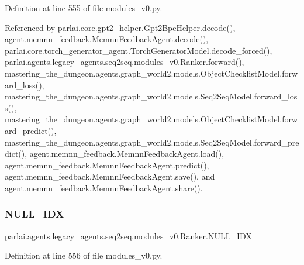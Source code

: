 Definition at line 555 of file modules\+\_\+v0.\+py.



Referenced by parlai.\+core.\+gpt2\+\_\+helper.\+Gpt2\+Bpe\+Helper.\+decode(), agent.\+memnn\+\_\+feedback.\+Memnn\+Feedback\+Agent.\+decode(), parlai.\+core.\+torch\+\_\+generator\+\_\+agent.\+Torch\+Generator\+Model.\+decode\+\_\+forced(), parlai.\+agents.\+legacy\+\_\+agents.\+seq2seq.\+modules\+\_\+v0.\+Ranker.\+forward(), mastering\+\_\+the\+\_\+dungeon.\+agents.\+graph\+\_\+world2.\+models.\+Object\+Checklist\+Model.\+forward\+\_\+loss(), mastering\+\_\+the\+\_\+dungeon.\+agents.\+graph\+\_\+world2.\+models.\+Seq2\+Seq\+Model.\+forward\+\_\+loss(), mastering\+\_\+the\+\_\+dungeon.\+agents.\+graph\+\_\+world2.\+models.\+Object\+Checklist\+Model.\+forward\+\_\+predict(), mastering\+\_\+the\+\_\+dungeon.\+agents.\+graph\+\_\+world2.\+models.\+Seq2\+Seq\+Model.\+forward\+\_\+predict(), agent.\+memnn\+\_\+feedback.\+Memnn\+Feedback\+Agent.\+load(), agent.\+memnn\+\_\+feedback.\+Memnn\+Feedback\+Agent.\+predict(), agent.\+memnn\+\_\+feedback.\+Memnn\+Feedback\+Agent.\+save(), and agent.\+memnn\+\_\+feedback.\+Memnn\+Feedback\+Agent.\+share().

\mbox{\label{classparlai_1_1agents_1_1legacy__agents_1_1seq2seq_1_1modules__v0_1_1Ranker_a17d8139e8d7e9952f0f17e8884710744}} 
\subsubsection{\texorpdfstring{N\+U\+L\+L\+\_\+\+I\+DX}{NULL\_IDX}}
{\footnotesize\ttfamily parlai.\+agents.\+legacy\+\_\+agents.\+seq2seq.\+modules\+\_\+v0.\+Ranker.\+N\+U\+L\+L\+\_\+\+I\+DX}



Definition at line 556 of file modules\+\_\+v0.\+py.



